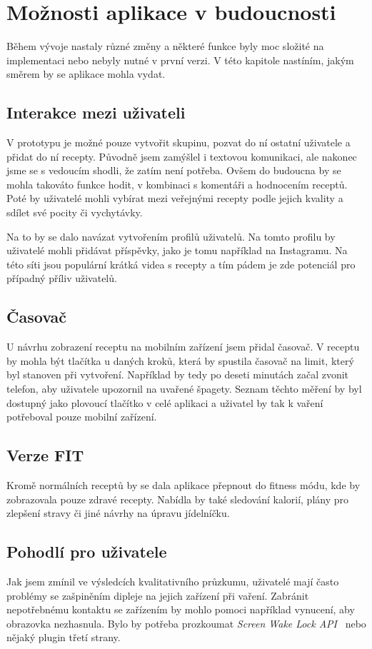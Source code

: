 
\chapter{Možnosti aplikace v budoucnosti}

Během vývoje nastaly různé změny a některé funkce byly moc složité na implementaci nebo nebyly nutné v první verzi.
V této kapitole nastíním, jakým směrem by se aplikace mohla vydat.

\section{Interakce mezi uživateli}
V prototypu je možné pouze vytvořit skupinu, pozvat do ní ostatní uživatele a přidat do ní recepty. Původně jsem zamýšlel
i textovou komunikaci, ale nakonec jsme se s vedoucím shodli, že zatím není potřeba. Ovšem do budoucna by se mohla takováto
funkce hodit, v kombinaci s komentáři a hodnocením receptů. Poté by uživatelé mohli vybírat mezi veřejnými recepty podle
jejich kvality a sdílet své pocity či vychytávky.

Na to by se dalo navázat vytvořením profilů uživatelů. Na tomto profilu by uživatelé mohli přidávat příspěvky, jako je tomu
například na Instagramu. Na této síti jsou populární krátká videa s recepty a tím pádem je zde potenciál pro případný %
příliv uživatelů.

\section{Časovač}
U návrhu zobrazení receptu na mobilním zařízení jsem přidal časovač. V receptu by mohla být tlačítka u daných kroků, která
by spustila časovač na limit, který byl stanoven při vytvoření. Například by tedy po deseti minutách začal zvonit telefon, aby
uživatele upozornil na uvařené špagety. Seznam těchto měření by byl dostupný jako plovoucí tlačítko
v celé aplikaci a uživatel by tak k vaření potřeboval pouze mobilní zařízení.

\section{Verze FIT}
Kromě normálních receptů by se dala aplikace přepnout do fitness módu, kde by zobrazovala pouze zdravé recepty. Nabídla by
také sledování kalorií, plány pro zlepšení stravy či jiné návrhy na úpravu jídelníčku.

\section{Pohodlí pro uživatele}
Jak jsem zmínil ve výsledcích kvalitativního průzkumu, uživatelé mají často problémy se zašpiněním dipleje na jejich zařízení při vaření.
Zabránit nepotřebnému kontaktu se zařízením by mohlo pomoci například vynucení, aby obrazovka nezhasnula. Bylo by potřeba prozkoumat
\emph{Screen Wake Lock API}~\cite{ScreenWakeLockAPI} nebo nějaký plugin třetí strany.

